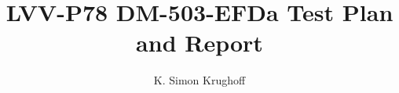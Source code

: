 \documentclass[DM,lsstdraft,toc]{lsstdoc}
\begin{document}
\def\milestoneName{DM-503-EFDa}
\def\milestoneId{LVV-P78}
\def\product{Data Management}


\title{LVV-P78 DM-503-EFDa Test Plan and Report}
\setDocRef{\lsstDocType-\lsstDocNum}
\date{\vcsdate}
\author{K. Simon Krughoff}



\end{document}
